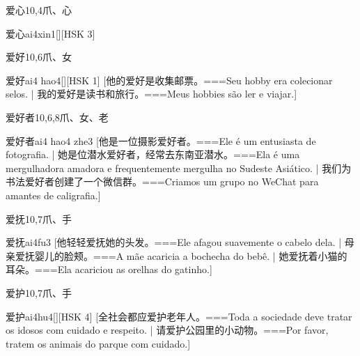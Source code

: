 \begin{Entry}{爱心}{10,4}{⽖、⼼}
  \begin{Phonetics}{爱心}{ai4xin1}[][HSK 3]
  \end{Phonetics}
\end{Entry}

\begin{Entry}{爱好}{10,6}{⽖、⼥}
  \begin{Phonetics}{爱好}{ai4 hao4}[][HSK 1]
    [他的爱好是收集邮票。===Seu hobby era colecionar selos.  | 我的爱好是读书和旅行。===Meus hobbies são ler e viajar.]
  \end{Phonetics}
\end{Entry}

\begin{Entry}{爱好者}{10,6,8}{⽖、⼥、⽼}
  \begin{Phonetics}{爱好者}{ai4 hao4 zhe3}
    [他是一位摄影爱好者。===Ele é um entusiasta de fotografia. | 她是位潜水爱好者，经常去东南亚潜水。===Ela é uma mergulhadora amadora e frequentemente mergulha no Sudeste Asiático.  | 我们为书法爱好者创建了一个微信群。===Criamos um grupo no WeChat para amantes de caligrafia.]
  \end{Phonetics}
\end{Entry}

\begin{Entry}{爱抚}{10,7}{⽖、⼿}
  \begin{Phonetics}{爱抚}{ai4fu3}
    [他轻轻爱抚她的头发。===Ele afagou suavemente o cabelo dela. | 母亲爱抚婴儿的脸颊。===A mãe acaricia a bochecha do bebê. | 她爱抚着小猫的耳朵。===Ela acariciou as orelhas do gatinho.]
  \end{Phonetics}
\end{Entry}

\begin{Entry}{爱护}{10,7}{⽖、⼿}
  \begin{Phonetics}{爱护}{ai4hu4}[][HSK 4]
    [全社会都应爱护老年人。===Toda a sociedade deve tratar os idosos com cuidado e respeito. | 请爱护公园里的小动物。===Por favor, tratem os animais do parque com cuidado.]
  \end{Phonetics}
\end{Entry}

